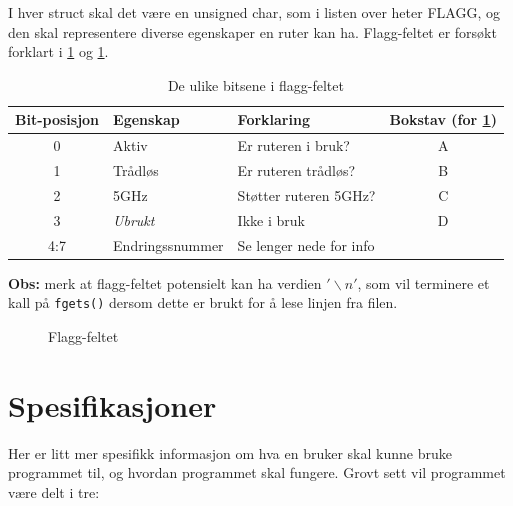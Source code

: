\documentclass[norsk]{article}
\begin{document}
I hver struct skal det være en unsigned char, som i listen over heter FLAGG, og den skal representere diverse egenskaper en ruter kan ha. Flagg-feltet er forsøkt forklart i \cref{tab:flagg} og \cref{fig:flagg}.

\begin{table}[H]
    \centering
    \begin{tabular}{c|l|l|c}
        Bit-posisjon & Egenskap & Forklaring & Bokstav (for \cref{fig:flagg})\\
        \hline
        0 & Aktiv & Er ruteren i bruk? & A \\
        1 & Trådløs & Er ruteren trådløs? & B \\
        2 & 5GHz & Støtter ruteren 5GHz? & C \\
        3 & \textit{Ubrukt} & Ikke i bruk & D \\
        4:7 & Endringssnummer & Se lenger nede for info & \\
    \end{tabular}
    \caption{De ulike bitsene i flagg-feltet}\label{tab:flagg}
    \vspace{1cm}
\end{table}

\textbf{Obs:} merk at flagg-feltet potensielt kan ha verdien $'\backslash n'$, som vil terminere et kall på \texttt{fgets()} dersom dette er brukt for å lese linjen fra filen.

\begin{figure}[H]
    \centering
    \caption{Flagg-feltet}\label{fig:flagg}
    \vspace{1cm}
\end{figure}

\section*{Spesifikasjoner}

Her er litt mer spesifikk informasjon om hva en bruker skal kunne bruke programmet til, og hvordan programmet skal fungere. Grovt sett vil programmet være delt i tre:
\end{document}
